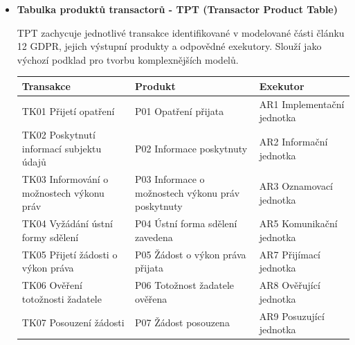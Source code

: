 \begin{itemize}
  \item \textbf{Tabulka produktů transactorů - TPT (Transactor Product Table)}
  
  TPT zachycuje jednotlivé transakce identifikované v modelované části článku 12 GDPR, jejich výstupní produkty a odpovědné exekutory. Slouží jako výchozí podklad pro tvorbu komplexnějších modelů.

  \begin{table}[H]
    \centering
    \renewcommand{\arraystretch}{1.3}
    \begin{tabular}{|p{3.7cm}|p{4.2cm}|p{4.1cm}|}
    \hline
    \textbf{Transakce} & \textbf{Produkt} & \textbf{Exekutor} \\
    \hline
    TK01 \newline Přijetí opatření & P01 \newline Opatření přijata & AR1 \newline Implementační jednotka \\
    \hline
    TK02 \newline Poskytnutí informací subjektu údajů & P02 \newline Informace poskytnuty & AR2 \newline Informační jednotka \\
    \hline
    TK03 \newline Informování o možnostech výkonu práv & P03 \newline Informace o možnostech výkonu práv poskytnuty & AR3 \newline Oznamovací jednotka \\
    \hline
    TK04 \newline Vyžádání ústní formy sdělení & P04 \newline Ústní forma sdělení zavedena & AR5 \newline Komunikační jednotka \\
    \hline
    TK05 \newline Přijetí žádosti o výkon práva & P05 \newline Žádost o výkon práva přijata & AR7 \newline Přijímací jednotka \\
    \hline
    TK06 \newline Ověření totožnosti žadatele & P06 \newline Totožnost žadatele ověřena & AR8 \newline Ověřující jednotka \\
    \hline
    TK07 \newline Posouzení žádosti & P07 \newline Žádost posouzena & AR9 \newline Posuzující jednotka \\

\end{tabular}
\end{table}
\end{itemize}
